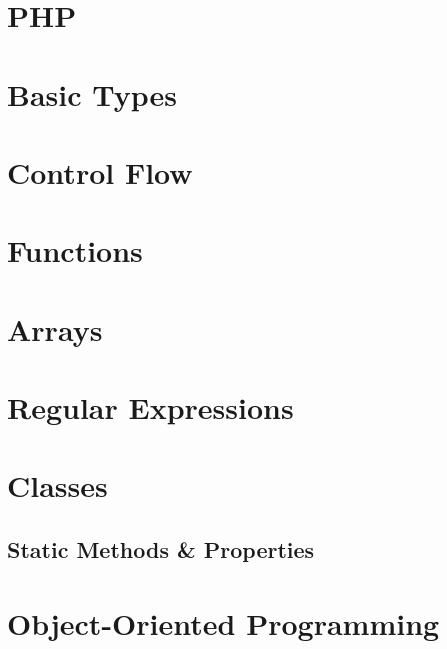 \documentclass[b5paper,openany]{book}
\begin{document}
\tp


\tableofcontents



\chapter{PHP}


\chapter{Basic Types}


\chapter{Control Flow}


\chapter{Functions}


\chapter{Arrays}


\chapter{Regular Expressions}


\chapter{Classes}


\begin{readonly}
    \chapter{Static Methods \& Properties}
    
\end{readonly}

\chapter{Object-Oriented Programming}







\end{document}
